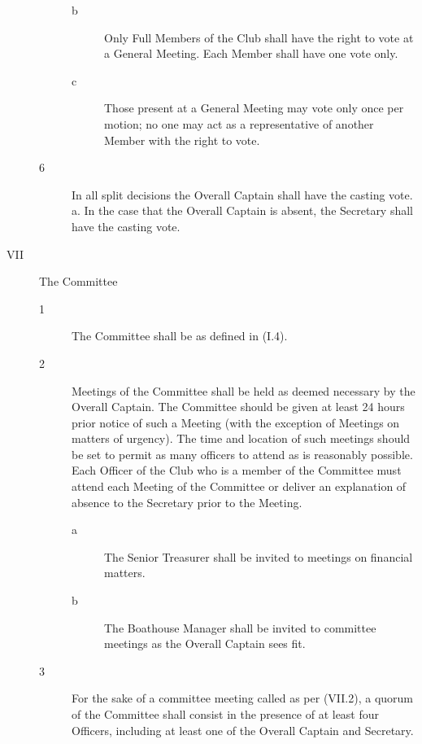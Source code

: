 \documentclass{article}
\begin{document}
\begin{description}
\begin{description}
\begin{description}
			\item[b] Only Full Members of the Club shall have the right to vote at a General
			Meeting. Each Member shall have one vote only.\\
			
			\item[c] Those present at a General Meeting may vote only once per motion; no
			one may act as a representative of another Member with the right to
			vote.\\
		\end{description}
		\item[6] In all split decisions the Overall Captain shall have the casting vote.
		a. In the case that the Overall Captain is absent, the Secretary shall have
		the casting vote.
	\end{description}

	\item[VII] The Committee
	\begin{description}
		\item[1] The Committee shall be as defined in (I.4).\\
		
		\item[2] Meetings of the Committee shall be held as deemed necessary by the Overall
		Captain. The Committee should be given at least 24 hours prior notice of such
		a Meeting (with the exception of Meetings on matters of urgency). The time
		and location of such meetings should be set to permit as many officers to
		attend as is reasonably possible. Each Officer of the Club who is a member of
		the Committee must attend each Meeting of the Committee or deliver an
		explanation of absence to the Secretary prior to the Meeting.\\
		\begin{description}
			\item[a] The Senior Treasurer shall be invited to meetings on financial matters.\\
			
			\item[b] The Boathouse Manager shall be invited to committee meetings as the
			Overall Captain sees fit.
		\end{description}
	
		\item[3] For the sake of a committee meeting called as per (VII.2), a quorum of the
		Committee shall consist in the presence of at least four Officers, including at
		least one of the Overall Captain and Secretary.\\
		

\end{description}
\end{description}
\end{document}

